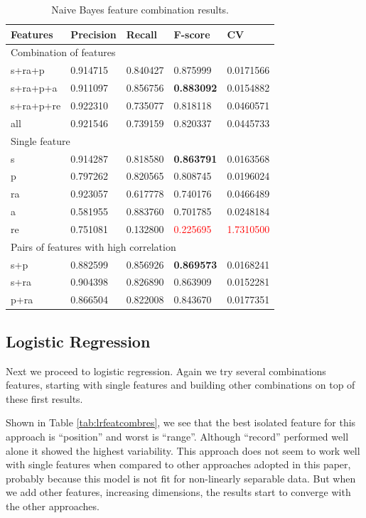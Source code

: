 \begin{table}[h]
\centering
\caption{Naive Bayes feature combination results.}
\label{tab:nbfeatcombres}
\begin{tabular}{ | l | l | l | l | l |}
\hline
Features & Precision & Recall & F-score & CV \\
\hline
\multicolumn{5}{|l|}{Combination of features} \\
\hline
s+ra+p   & 0.914715 & 0.840427 & 0.875999 & 0.0171566 \\
s+ra+p+a & 0.911097 & 0.856756 & \textbf{0.883092} & 0.0154882 \\
s+ra+p+re& 0.922310 & 0.735077 & 0.818118 & 0.0460571 \\
all      & 0.921546 & 0.739159 & 0.820337 & 0.0445733 \\
\hline
\multicolumn{5}{|l|}{Single feature} \\
\hline
s        & 0.914287 & 0.818580 & \textbf{0.863791} & 0.0163568 \\
p        & 0.797262 & 0.820565 & 0.808745 & 0.0196024 \\
ra       & 0.923057 & 0.617778 & 0.740176 & 0.0466489 \\
a        & 0.581955 & 0.883760 & 0.701785 & 0.0248184 \\
re       & 0.751081 & 0.132800 & \textcolor{red}{0.225695} & \textcolor{red}{1.7310500} \\
\hline
\multicolumn{5}{|l|}{Pairs of features with high correlation} \\
\hline
s+p      & 0.882599 & 0.856926 & \textbf{0.869573} & 0.0168241 \\
s+ra     & 0.904398 & 0.826890 & 0.863909 & 0.0152281 \\
p+ra     & 0.866504 & 0.822008 & 0.843670 & 0.0177351 \\
\hline
\end{tabular}
\end{table}

\subsection{Logistic Regression}\label{ss:log}
Next we proceed to logistic regression. Again we try several combinations
features, starting with single features and building other combinations on top
of these first results.

Shown in Table \ref{tab:lrfeatcombres}, we see that the best isolated feature
for this approach is ``position'' and worst is ``range''. Although ``record''
performed well alone it showed the highest variability. This approach does not
seem to work well with single features when compared to other approaches adopted
in this paper, probably because this model is not fit for non-linearly separable
data. But when we add other features, increasing dimensions, the results start
to converge with the other approaches.

